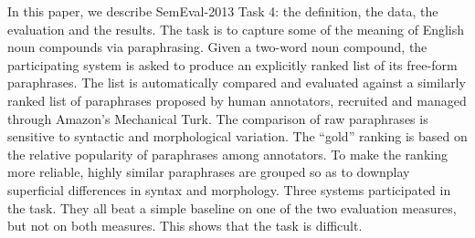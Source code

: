 In this paper, we describe SemEval-2013 Task 4: the definition, the data, the evaluation and the results. The task is to capture some of the meaning of
 English noun compounds via paraphrasing. Given a two-word noun compound, the
 participating system is asked to produce an explicitly ranked list of its
 free-form paraphrases. The list is automatically compared and evaluated against
 a similarly ranked list of paraphrases proposed by human annotators, recruited
 and managed through Amazon's Mechanical Turk. The comparison of raw paraphrases
 is sensitive to syntactic and morphological variation. The ``gold'' ranking is
 based on the relative popularity of paraphrases among annotators. To make the
 ranking more reliable, highly similar paraphrases are grouped so as to downplay
 superficial differences in syntax and morphology. Three systems participated in
 the task. They all beat a simple baseline on one of the two evaluation
 measures, but not on both measures. This shows that the task is difficult.

